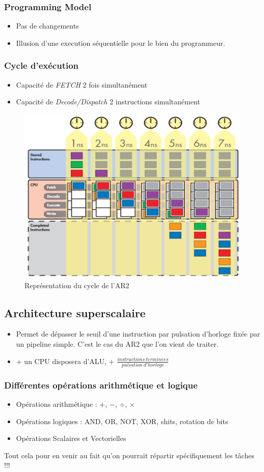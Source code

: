 \documentclass[a4paper]{article}
\begin{document}
    \subsubsection{Programming Model}
    \begin{itemize}
      \item Pas de changements
      \item Illusion d'une execution séquentielle pour le bien du programmeur.
    \end{itemize}

    \subsubsection{Cycle d'exécution}
    \begin{itemize}
      \item Capacité de \emph{FETCH} 2 fois simultanément
      \item Capacité de \emph{Decode/Dispatch} 2 instructions simultanément
    \end{itemize}
    \begin{figure}[H]
      \centering
      \includegraphics[width = 0.4 \textwidth]{images/4.PNG}
      \caption{Représentation du cycle de l'AR2}
    \end{figure}

    \subsection{Architecture superscalaire}
    \begin{itemize}
      \item Permet de dépasser le seuil d'une instruction par pulsation d'horloge fixée par un pipeline simple. C'est le cas du AR2 que l'on vient de traiter.
      \item + un CPU disposera d'ALU, + $\frac{instructions\ terminees}{pulsation\ d'horloge}$
    \end{itemize}

    \subsubsection{Différentes opérations arithmétique et logique}
    \begin{itemize}
      \item Opérations arithmétique : $+$, $-$, $\div$, $\times$
      \item Opérations logiques : AND, OR, NOT, XOR, shits, rotation de bits
      \item Opérations Scalaires et Vectorielles
    \end{itemize}
    Tout cela pour en venir au fait qu'on pourrait répartir spécifiquement les tâches !!!
\end{document}
